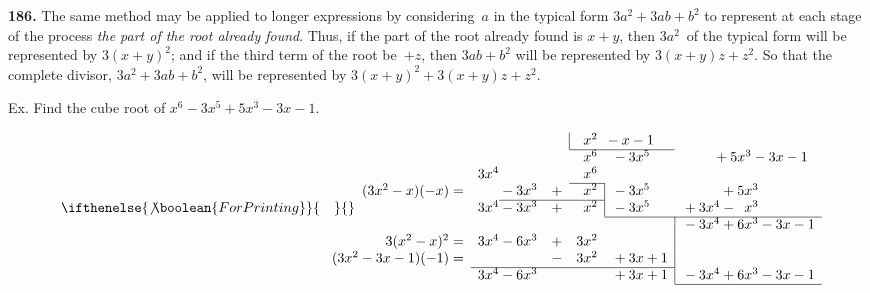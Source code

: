 \documentclass[12pt]{book}[2005/09/16]
\makeatletter
\newcommand{\Paragraph}[1]{\medskip\par\textbf{#1}}
\newenvironment{Soln}[1][]{\par\small\textsc{#1}}{\par}
\newcommand{\DPtypo}[2]{#2}
\newcommand{\Z}{\phantom{0}}
\newcommand{\TbBar}[1]{\multicolumn{1}{@{}r|}{#1}}
\makeatother
\begin{document}
\Paragraph{186.}  The same method may be applied to longer expressions
by considering~$a$ in the typical form $3a^{2} + 3ab + b^{2}$
to represent at each stage of the process \emph{the part of the root
already found}.  Thus, if the part of the root already found
is $x + y$, then $3a^{2}$~of the typical form will be represented
by $3(x + y)^{2}$; and if the third term of the root be~$+z$, \DPtypo{the}{then}
$3ab + b^{2}$ will be represented by $3(x + y)z + z^{2}$. So that
the complete divisor, $3a^{2} + 3ab + b^{2}$, will be represented
by $3(x + y)^{2} + 3(x + y)z + z^{2}$.

Ex.  Find the cube root of $x^{6} - 3x^{5} + 5x^{3} - 3x - 1$.
\begin{Soln}
\[
\ifthenelse{\not\boolean{ForPrinting}}{\quad}{}
\begin{array}{*{2}{r}@{}*{3}{r}*{4}{l}}
                       &       &   & \TbBar{}&  x^{2}& \multicolumn{3}{@{}l}{{} - x - 1} \\
\cline{5-6}
                       &       &           & &  x^{6}& {} - 3x^{5} &\multicolumn{2}{@{}l}{\phantom{{}+ 3x^{4}} + 5x^{3} - 3x - 1} \\
                       & 3x^{4}&           & &  x^{6} \\
\cline{5-5}
     (3x^{2} - x)(-x) =&       &{} - 3x^{3}&+&  \TbBar{x^{2}}&{} - 3x^{5}&\phantom{{}+ 3x^{4}} + 5x^{3} \\
\cline{3-5}
                       & 3x^{4}&{} - 3x^{3}&+&  \TbBar{x^{2}}&{} - 3x^{5}&{} + 3x^{4} - \Z x^{3} \\
\cline{6-7}
                       &       &           & &       &\TbBar{}           &{} - 3x^{4} + 6x^{3} - 3x - 1 \\
     3(x^{2} - x)^{2} =& 3x^{4}&{} - 6x^{3}&+& 3x^{2}&\TbBar{} \\
\llap{$(3x^{2} - 3x - 1)$}(-1) =&       &           &-& 3x^{2}& \multicolumn{1}{l|}{{}+ 3x + 1} \\
\cline{2-6}
                       & 3x^{4}&{} - 6x^{3}& &       & \multicolumn{1}{l|}{{}+ 3x + 1}&{} - 3x^{4} + 6x^{3} - 3x - 1 \\
\cline{7-7}
\end{array}
\]
\end{Soln}
\end{document}
